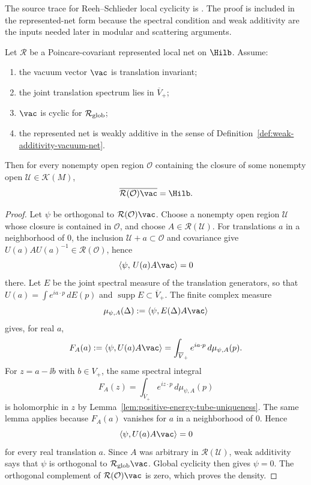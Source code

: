 \noindent
The source trace for Reeh--Schlieder local cyclicity is
\cite{ReehSchlieder1961,StreaterWightman1964}.  The proof is included in the
represented-net form because the spectral condition and weak additivity are
the inputs needed later in modular and scattering arguments.

\begin{theorem}
\label{thm:reeh-schlieder-weakly-additive-net}
Let \(\mathcal R\) be a Poincare-covariant represented local net on
\(\Hilb\).  Assume:
\begin{enumerate}[label=\textup{(\roman*)}]
\item the vacuum vector \(\vac\) is translation invariant;
\item the joint translation spectrum lies in \(\overline V_+\);
\item \(\vac\) is cyclic for \(\mathcal R_{\rm glob}\);
\item the represented net is weakly additive in the sense of
Definition~\ref{def:weak-additivity-vacuum-net}.
\end{enumerate}
Then for every nonempty open region \(\mathcal O\) containing the closure of
some nonempty open \(\mathcal U\in\mathcal K(M)\),
\[
  \overline{\mathcal R(\mathcal O)\vac}=\Hilb .
\]
\end{theorem}

\begin{proof}
Let \(\psi\) be orthogonal to
\(\mathcal R(\mathcal O)\vac\).  Choose a nonempty open region
\(\mathcal U\) whose closure is contained in \(\mathcal O\), and choose
\(A\in\mathcal R(\mathcal U)\).  For translations \(a\) in a neighborhood of
\(0\), the inclusion \(\mathcal U+a\subset\mathcal O\) and covariance give
\(U(a)AU(a)^{-1}\in\mathcal R(\mathcal O)\), hence
\[
  \langle \psi,\,U(a)A\vac\rangle=0
\]
there.  Let \(E\) be the joint spectral measure of the translation
generators, so that \(U(a)=\int e^{ia\cdot p}\,dE(p)\) and
\(\operatorname{supp}E\subset\overline V_+\).  The finite complex measure
\[
  \mu_{\psi,A}(\Delta)
  :=
  \langle\psi,E(\Delta)A\vac\rangle
\]
gives, for real \(a\),
\[
  F_A(a):=\langle\psi,U(a)A\vac\rangle
  =
  \int_{\overline V_+} e^{ia\cdot p}\,d\mu_{\psi,A}(p).
\]
For \(z=a-\ii b\) with \(b\in V_+\), the same spectral integral
\[
  F_A(z)
  =
  \int_{\overline V_+} e^{iz\cdot p}\,d\mu_{\psi,A}(p)
\]
is holomorphic in \(z\) by
Lemma~\ref{lem:positive-energy-tube-uniqueness}.  The same lemma applies
because \(F_A(a)\) vanishes for \(a\) in a neighborhood of \(0\).  Hence
\[
  \langle \psi,U(a)A\vac\rangle=0
\]
for every real translation \(a\).  Since \(A\) was arbitrary in
\(\mathcal R(\mathcal U)\), weak additivity says that \(\psi\) is orthogonal
to \(\mathcal R_{\rm glob}\vac\).  Global cyclicity then gives \(\psi=0\).
The orthogonal complement of \(\mathcal R(\mathcal O)\vac\) is zero, which
proves the density.
\end{proof}

